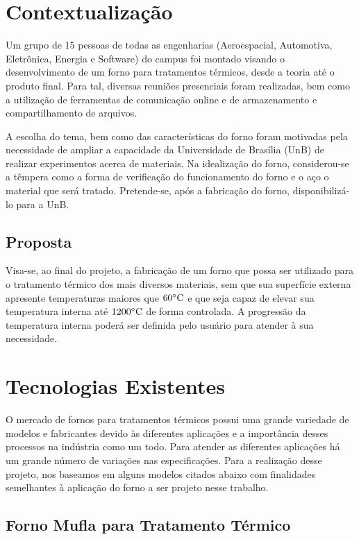 \section{Contextualização}

Um grupo de 15 pessoas de todas as engenharias (Aeroespacial, Automotiva, Eletrônica, Energia e Software) do campus foi montado visando o desenvolvimento de um forno para tratamentos térmicos, desde a teoria até o produto final. Para tal, diversas reuniões presenciais foram realizadas, bem como a utilização de ferramentas de comunicação online e de armazenamento e compartilhamento de arquivos.

A escolha do tema, bem como das características do forno foram motivadas pela necessidade de ampliar a capacidade da Universidade de Brasília (UnB) de realizar experimentos acerca de materiais. Na idealização do forno, considerou-se a têmpera como a forma de verificação do funcionamento do forno e o aço o material que será tratado. Pretende-se, após a fabricação do forno, disponibilizá-lo para a UnB.

\subsection{Proposta}

Visa-se, ao final do projeto, a fabricação de um forno que possa ser utilizado para o tratamento térmico dos mais diversos materiais, sem que sua superfície externa apresente temperaturas maiores que $60 \degree \text{C}$ e que seja capaz de elevar sua temperatura interna até $1200 \degree \text{C}$ de forma controlada. A progressão da temperatura interna poderá ser definida pelo usuário para atender à sua necessidade.

\section{Tecnologias Existentes}

O mercado de fornos para tratamentos térmicos possui uma grande variedade de modelos e fabricantes devido às diferentes aplicações e a importância desses processos na indústria como um todo. Para atender as diferentes aplicações há um grande número de variações nas especificações. Para a realização desse projeto, nos baseamos em alguns modelos citados abaixo com finalidades semelhantes à aplicação do forno a ser projeto nesse trabalho.

\subsection{Forno Mufla para Tratamento Térmico}

